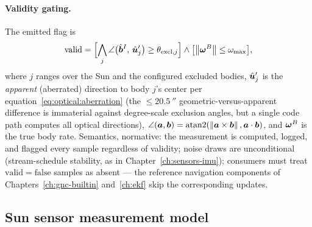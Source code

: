 \paragraph{Validity gating.} The emitted flag is
\begin{equation}
  \mathrm{valid} =
    \Bigl[\bigwedge_{j}
      \angle\bigl(\hat{\bm{b}}^{I},\, \hat{\bm{u}}'_j\bigr)
        \ge \theta_{\mathrm{excl},j}\Bigr]
    \wedge
    \bigl[\left\lVert \bm{\omega}^{B} \right\rVert \le \omega_{\max}\bigr],
  \label{eq:optical:gating}
\end{equation}
where $j$ ranges over the Sun and the configured excluded bodies,
$\hat{\bm{u}}'_j$ is the \emph{apparent} (aberrated) direction to body
$j$'s center per equation~\eqref{eq:optical:aberration} (the
$\le \qty{20.5}{\arcsecond}$ geometric-versus-apparent difference is
immaterial against degree-scale exclusion angles, but a single code path
computes all optical directions), $\angle(\bm{a},\bm{b}) =
\operatorname{atan2}(\left\lVert \bm{a}\times\bm{b} \right\rVert, \bm{a}\cdot\bm{b})$, and
$\bm{\omega}^{B}$ is the true body rate. Semantics, normative: the
measurement is computed, logged, and flagged every sample regardless of
validity; noise draws are unconditional (stream-schedule stability, as
in Chapter~\ref{ch:sensors-imu}); consumers must treat
$\mathrm{valid} = \mathrm{false}$ samples as absent --- the reference
navigation components of Chapters~\ref{ch:gnc-builtin} and~\ref{ch:ekf}
skip the corresponding updates.

\subsection{Sun sensor measurement model}
\label{sec:optical:sunsensor}

